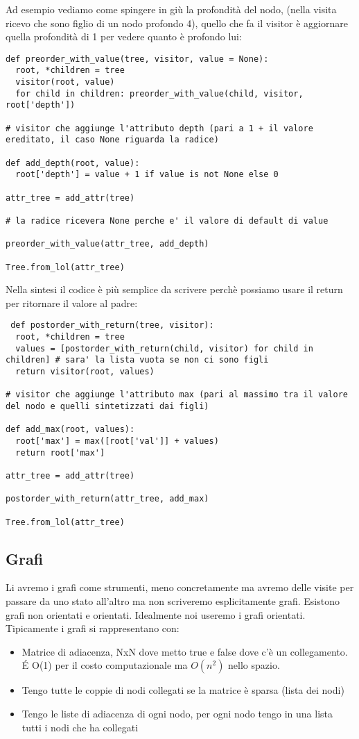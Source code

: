 Ad esempio vediamo come spingere in giù la profondità del nodo, (nella visita ricevo che sono figlio di un nodo profondo 4), quello che fa il visitor è aggiornare quella profondità di 1 per vedere quanto è profondo lui:
\begin{lstlisting}
def preorder_with_value(tree, visitor, value = None):
  root, *children = tree
  visitor(root, value)
  for child in children: preorder_with_value(child, visitor, root['depth'])

# visitor che aggiunge l'attributo depth (pari a 1 + il valore ereditato, il caso None riguarda la radice)

def add_depth(root, value):
  root['depth'] = value + 1 if value is not None else 0

attr_tree = add_attr(tree)

# la radice ricevera None perche e' il valore di default di value

preorder_with_value(attr_tree, add_depth) 

Tree.from_lol(attr_tree)
\end{lstlisting}

Nella sintesi il codice è più semplice da scrivere perchè possiamo usare il return per ritornare il valore al padre:
\begin{lstlisting}
 def postorder_with_return(tree, visitor):
  root, *children = tree
  values = [postorder_with_return(child, visitor) for child in children] # sara' la lista vuota se non ci sono figli
  return visitor(root, values)

# visitor che aggiunge l'attributo max (pari al massimo tra il valore del nodo e quelli sintetizzati dai figli)

def add_max(root, values):
  root['max'] = max([root['val']] + values)
  return root['max']

attr_tree = add_attr(tree)

postorder_with_return(attr_tree, add_max)

Tree.from_lol(attr_tree)
\end{lstlisting}

\subsection{Grafi}
Li avremo i grafi come strumenti, meno concretamente ma avremo delle visite per passare da uno stato all'altro ma non scriveremo esplicitamente grafi.
Esistono grafi non orientati e orientati. Idealmente noi useremo i grafi orientati. Tipicamente i grafi si rappresentano con:
\begin{itemize}
    \item Matrice di adiacenza, NxN dove metto true e false dove c'è un collegamento. \'E O(1) per il costo computazionale ma $O(n^2)$ nello spazio.
    \item Tengo tutte le coppie di nodi collegati se la matrice è sparsa (lista dei nodi)
    \item Tengo le liste di adiacenza di ogni nodo, per ogni nodo tengo in una lista tutti i nodi che ha collegati
\end{itemize}

